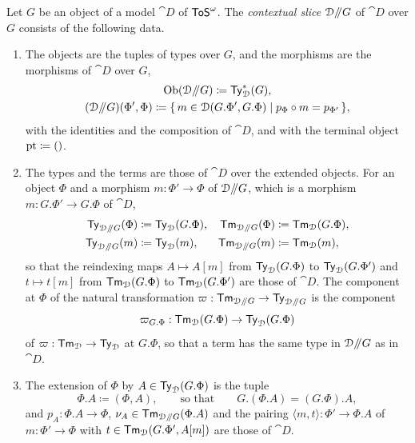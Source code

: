 \begin{definition}\label{def:contextual-slice}
    Let $G$ be an object of a model $\cat{D}$ of $\mathsf{ToS}^\omega$. The \emph{contextual slice} $\mathcal{D}\mathord{/\mkern-5mu/} G$ of $\cat{D}$ over $G$ consists of the following data.
    \begin{enumerate}
        \item The objects are the tuples of types over $G$, and the morphisms are the morphisms of $\cat{D}$ over $G$,
        \begin{gather*}
            \operatorname{Ob}(\mathcal{D}\mathord{/\mkern-5mu/} G) \coloneqq \mathsf{Ty}^*_{\mathcal{D}}(G),\\
            (\mathcal{D}\mathord{/\mkern-5mu/} G)(\Phi', \Phi) \coloneqq \{\, m \in \mathcal{D}(G.\Phi', G.\Phi) \mid p_\Phi \circ m = p_{\Phi'} \,\},
        \end{gather*}
        with the identities and the composition of $\cat{D}$, and with the terminal object $\mathrm{pt} \coloneqq ()$.
        \item The types and the terms are those of $\cat{D}$ over the extended objects. For an object $\Phi$ and a morphism $m : \Phi' \to \Phi$ of $\mathcal{D}\mathord{/\mkern-5mu/} G$, which is a morphism $m : G.\Phi' \to G.\Phi$ of $\cat{D}$,
        \begin{align*}
            \mathsf{Ty}_{\mathcal{D}\mathord{/\mkern-5mu/} G}(\Phi) &\coloneqq \mathsf{Ty}_{\mathcal{D}}(G.\Phi), & \mathsf{Tm}_{\mathcal{D}\mathord{/\mkern-5mu/} G}(\Phi) &\coloneqq \mathsf{Tm}_{\mathcal{D}}(G.\Phi),\\
            \mathsf{Ty}_{\mathcal{D}\mathord{/\mkern-5mu/} G}(m) &\coloneqq \mathsf{Ty}_{\mathcal{D}}(m), & \mathsf{Tm}_{\mathcal{D}\mathord{/\mkern-5mu/} G}(m) &\coloneqq \mathsf{Tm}_{\mathcal{D}}(m),
        \end{align*}
        so that the reindexing maps $A \mapsto A[m]$ from $\mathsf{Ty}_{\mathcal{D}}(G.\Phi)$ to $\mathsf{Ty}_{\mathcal{D}}(G.\Phi')$ and $t \mapsto t[m]$ from $\mathsf{Tm}_{\mathcal{D}}(G.\Phi)$ to $\mathsf{Tm}_{\mathcal{D}}(G.\Phi')$ are those of $\cat{D}$. The component at $\Phi$ of the natural transformation $\varpi : \mathsf{Tm}_{\mathcal{D}\mathord{/\mkern-5mu/} G} \to \mathsf{Ty}_{\mathcal{D}\mathord{/\mkern-5mu/} G}$ is the component
        \[
            \varpi_{G.\Phi} : \mathsf{Tm}_{\mathcal{D}}(G.\Phi) \to \mathsf{Ty}_{\mathcal{D}}(G.\Phi)
        \]
        of $\varpi : \mathsf{Tm}_{\mathcal{D}} \to \mathsf{Ty}_{\mathcal{D}}$ at $G.\Phi$, so that a term has the same type in $\mathcal{D}\mathord{/\mkern-5mu/} G$ as in $\cat{D}$.
        \item The extension of $\Phi$ by $A \in \mathsf{Ty}_{\mathcal{D}}(G.\Phi)$ is the tuple
        \[
            \Phi.A \coloneqq (\Phi, A), \qquad \text{so that} \qquad G.(\Phi.A) = (G.\Phi).A,
        \]
        and $p_A : \Phi.A \to \Phi$, $\nu_A \in \mathsf{Tm}_{\mathcal{D}\mathord{/\mkern-5mu/} G}(\Phi.A)$ and the pairing $\langle m, t \rangle : \Phi' \to \Phi.A$ of $m : \Phi' \to \Phi$ with $t \in \mathsf{Tm}_{\mathcal{D}}(G.\Phi', A[m])$ are those of $\cat{D}$.

\end{enumerate}
\end{definition}
